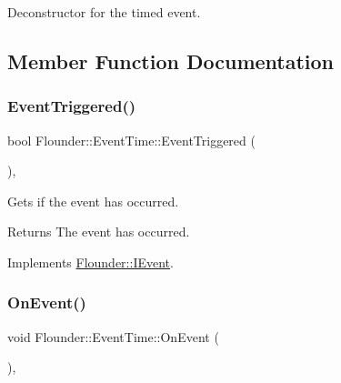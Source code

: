 Deconstructor for the timed event. 



\subsection{Member Function Documentation}
\mbox{\label{class_flounder_1_1_event_time_a4651610c70a6a869c0f6c223d8f7eb52}} 
\subsubsection{\texorpdfstring{Event\+Triggered()}{EventTriggered()}}
{\footnotesize\ttfamily bool Flounder\+::\+Event\+Time\+::\+Event\+Triggered (\begin{DoxyParamCaption}{ }\end{DoxyParamCaption})\hspace{0.3cm}{\ttfamily [override]}, {\ttfamily [virtual]}}



Gets if the event has occurred. 

\begin{DoxyReturn}{Returns}
The event has occurred. 
\end{DoxyReturn}


Implements \hyperlink{class_flounder_1_1_i_event_a86004d7cbef85aa2f80e6def5dc107b3}{Flounder\+::\+I\+Event}.

\mbox{\label{class_flounder_1_1_event_time_abeafc8779ee5be6e8b4ec701029fb15e}} 
\subsubsection{\texorpdfstring{On\+Event()}{OnEvent()}}
{\footnotesize\ttfamily void Flounder\+::\+Event\+Time\+::\+On\+Event (\begin{DoxyParamCaption}{ }\end{DoxyParamCaption})\hspace{0.3cm}{\ttfamily [override]}, {\ttfamily [virtual]}}



